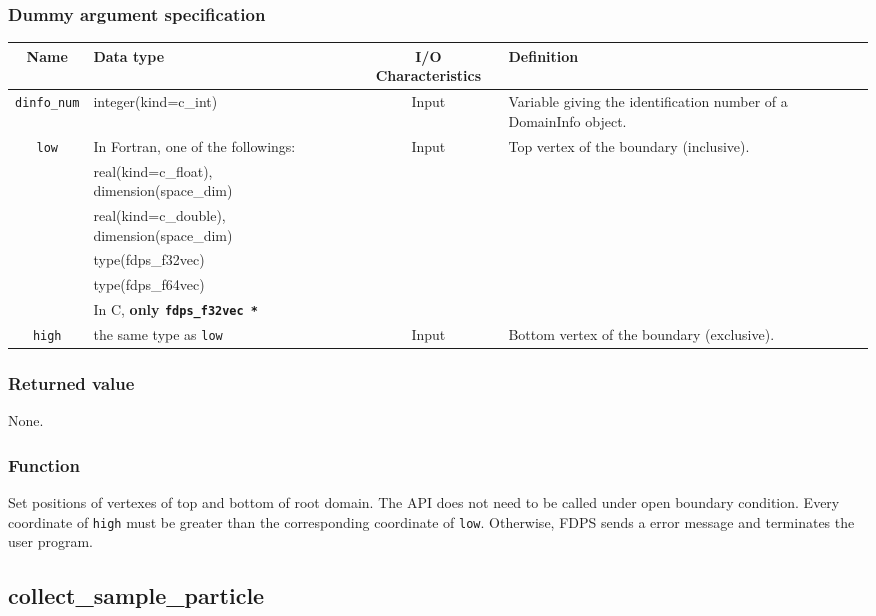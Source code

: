 \subsubsection*{Dummy argument specification}
\begin{table}[h]
\begin{tabularx}{\linewidth}{cp{6cm}cX}
\toprule
\rowcolor{Snow2}
Name & Data type & I/O Characteristics & Definition \\
\midrule
\texttt{dinfo\_num} & integer(kind=c\_int) & Input & Variable giving the identification number of a DomainInfo object.\\
\texttt{low} & In Fortran, one of the followings: & Input & \multirow[t]{6}{\hsize}{Top vertex of the boundary (inclusive).} \\
& real(kind=c\_float), \newline\hspace{1em} dimension(space\_dim) &&\\
& real(kind=c\_double), \newline\hspace{1em}dimension(space\_dim) &&\\
& type(fdps\_f32vec) &&\\
& type(fdps\_f64vec) &&\\
& In C, \textbf{only \texttt{fdps\_f32vec *}} &&\\
\texttt{high} & the same type as \texttt{low} & Input & Bottom vertex of the boundary (exclusive). \\
\bottomrule
\end{tabularx}
\end{table}

\subsubsection*{Returned value}
None.

\subsubsection*{Function}
Set positions of vertexes of top and bottom of root domain. The API does not need to be called under open boundary condition. Every coordinate of \texttt{high} must be greater than the corresponding coordinate of \texttt{low}. Otherwise, FDPS sends a error message and terminates the user program.

\clearpage

\subsection{collect\_sample\_particle}
